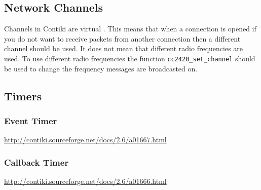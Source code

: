 \subsection{Network Channels}

Channels in Contiki are virtual \cite{tel-aviv-contiki-exercises}. This means that when a connection is opened if you do not want to receive packets from another connection then a different channel should be used. It does not mean that different radio frequencies are used. To use different radio frequencies the function \verb|cc2420_set_channel| should be used to change the frequency messages are broadcasted on.


\subsection{Timers}

\subsubsection{Event Timer}

\url{http://contiki.sourceforge.net/docs/2.6/a01667.html}

\subsubsection{Callback Timer}

\url{http://contiki.sourceforge.net/docs/2.6/a01666.html}

